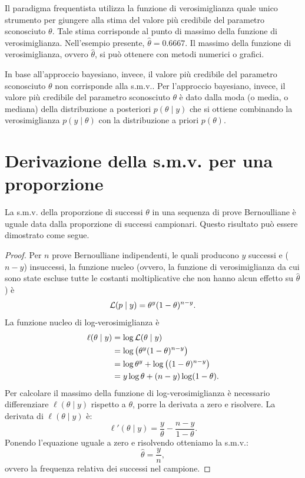 \documentclass[
  10pt,
  italian,
  a4paper,
  extrafontsizes,onecolumn,openright
  ]{memoir}
\theoremstyle{definition}
\theoremstyle{definition}
\theoremstyle{definition}
\theoremstyle{definition}
\theoremstyle{remark}
\begin{document}
Il paradigma frequentista utilizza la funzione di verosimiglianza quale unico strumento per giungere alla stima del valore più credibile del parametro sconosciuto \(\theta\). Tale stima corrisponde al punto di massimo della funzione di verosimiglianza. Nell'esempio presente, \(\hat{\theta} = 0.6667\). Il massimo della funzione di verosimiglianza, ovvero \(\hat{\theta}\), si può ottenere con metodi numerici o grafici.

In base all'approccio bayesiano, invece, il valore più credibile del parametro sconosciuto \(\theta\) non corrisponde alla s.m.v.. Per l'approccio bayesiano, invece, il valore più credibile del parametro sconosciuto \(\theta\) è dato dalla moda (o media, o mediana) della distribuzione a posteriori \(p(\theta \mid y)\) che si ottiene combinando la verosimiglianza \(p(y \mid \theta)\) con la distribuzione a priori \(p(\theta)\).

\hypertarget{derivation-smv-prop}{%
\section{Derivazione della s.m.v. per una proporzione}\label{derivation-smv-prop}}

La s.m.v. della proporzione di successi \(\theta\) in una sequenza di prove Bernoulliane è uguale data dalla proporzione di successi campionari. Questo risultato può essere dimostrato come segue.

\begin{proof}
Per \(n\) prove Bernoulliane indipendenti, le quali producono \(y\) successi e (\(n-y\)) insuccessi, la funzione nucleo (ovvero, la funzione di verosimiglianza da cui sono state escluse tutte le costanti moltiplicative che non hanno alcun effetto su \(\hat{\theta}\)) è
\[
\mathcal{L}(p \mid y) = \theta^y (1-\theta)^{n - y}.\notag
\]
La funzione nucleo di log-verosimiglianza è
\[
\begin{aligned}
\ell(\theta \mid y) &= \log \mathcal{L}(\theta \mid y) \notag\\
          &= \log \left(\theta^y (1-\theta)^{n - y} \right) \notag\\
          &= \log \theta^y + \log \left( (1-\theta)^{n - y} \right) \notag\\
          &= y \log \theta + (n - y) \log (1-\theta).\notag
\end{aligned}
\]
Per calcolare il massimo della funzione di log-verosimiglianza è necessario differenziare \(\ell(\theta \mid y)\) rispetto a \(\theta\), porre la derivata a zero e risolvere. La derivata di \(\ell(\theta \mid y)\) è:
\[
\ell'(\theta \mid y) = \frac{y}{\theta} -\frac{n-y}{1-\theta}.
\]
Ponendo l'equazione uguale a zero e risolvendo otteniamo la s.m.v.:
\begin{equation}
  \hat{\theta} = \frac{y}{n},
  \label{eq:mlprop}
\end{equation}
ovvero la frequenza relativa dei successi nel campione.
\end{proof}
\end{document}
